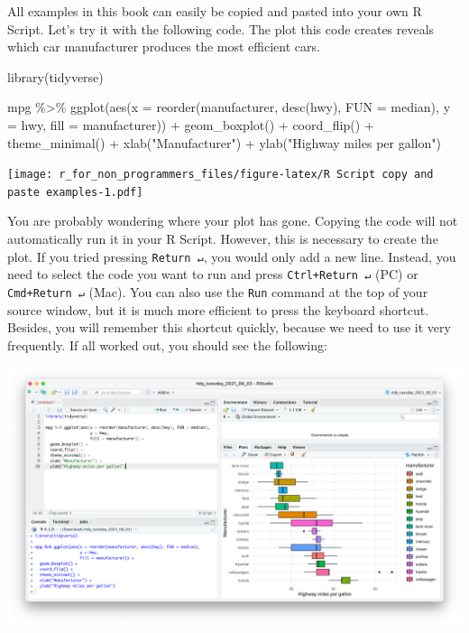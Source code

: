 \documentclass[
]{book}
\newenvironment{Shaded}{\begin{snugshade}}{\end{snugshade}}
\newcommand{\AttributeTok}[1]{\textcolor[rgb]{0.77,0.63,0.00}{#1}}
\newcommand{\FunctionTok}[1]{\textcolor[rgb]{0.00,0.00,0.00}{#1}}
\newcommand{\NormalTok}[1]{#1}
\newcommand{\SpecialCharTok}[1]{\textcolor[rgb]{0.00,0.00,0.00}{#1}}
\newcommand{\StringTok}[1]{\textcolor[rgb]{0.31,0.60,0.02}{#1}}
\begin{document}
All examples in this book can easily be copied and pasted into your own R Script. Let's try it with the following code. The plot this code creates reveals which car manufacturer produces the most efficient cars.

\begin{Shaded}
\begin{Highlighting}[]
\FunctionTok{library}\NormalTok{(tidyverse)}

\NormalTok{mpg }\SpecialCharTok{\%\textgreater{}\%} \FunctionTok{ggplot}\NormalTok{(}\FunctionTok{aes}\NormalTok{(}\AttributeTok{x =} \FunctionTok{reorder}\NormalTok{(manufacturer, }\FunctionTok{desc}\NormalTok{(hwy), }\AttributeTok{FUN =}\NormalTok{ median),}
                   \AttributeTok{y =}\NormalTok{ hwy,}
                   \AttributeTok{fill =}\NormalTok{ manufacturer)) }\SpecialCharTok{+}
  \FunctionTok{geom\_boxplot}\NormalTok{() }\SpecialCharTok{+}
  \FunctionTok{coord\_flip}\NormalTok{() }\SpecialCharTok{+}
  \FunctionTok{theme\_minimal}\NormalTok{() }\SpecialCharTok{+}
  \FunctionTok{xlab}\NormalTok{(}\StringTok{"Manufacturer"}\NormalTok{) }\SpecialCharTok{+}
  \FunctionTok{ylab}\NormalTok{(}\StringTok{"Highway miles per gallon"}\NormalTok{)}
\end{Highlighting}
\end{Shaded}

\texttt{[image: r\_for\_non\_programmers\_files/figure-latex/R Script copy and paste examples-1.pdf]}

You are probably wondering where your plot has gone. Copying the code will not automatically run it in your R Script. However, this is necessary to create the plot. If you tried pressing \texttt{Return\ ↵}, you would only add a new line. Instead, you need to select the code you want to run and press \texttt{Ctrl+Return\ ↵} (PC) or \texttt{Cmd+Return\ ↵} (Mac). You can also use the \texttt{Run} command at the top of your source window, but it is much more efficient to press the keyboard shortcut. Besides, you will remember this shortcut quickly, because we need to use it very frequently. If all worked out, you should see the following:

\includegraphics{images/chapter_06_img/02_r_script/01_r_script_example_plot.png}
\end{document}
